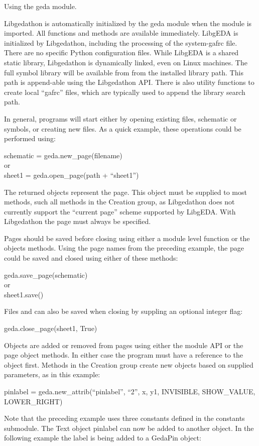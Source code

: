  Using the geda module. 

  Libgedathon is automatically initialized by the geda module when the module is imported. All functions and methods are available immediately. LibgEDA is initialized by Libgedathon, including the processing of the system-gafrc file. There are no specific Python configuration files. While LibgEDA is a shared static library, Libgedathon is dynamically linked, even on Linux machines. The full symbol library will be available from from the installed library path. This path is append-able using the Libgedathon API. There is also utility functions to create local ``gafrc'' files, which are typically used to append the library search path. 


  In general, programs will start either by opening existing files, schematic or symbols, or creating new files. As a quick example, these operations could be performed using:

schematic = geda.new\_page(filename)\\ 
 or\\ 
sheet1 = geda.open\_page(path + ``sheet1'')


  The returned objects represent the page. This object must be supplied to most methods, such all methods in the Creation group, as Libgedathon does not currently support the ``current page'' scheme supported by LibgEDA. With Libgedathon the page must always be specified. 


  Pages should be saved before closing using either a module level function or the objects methods. Using the page names from the preceding example, the page could be saved and closed using either of these methods:

geda.save\_page(schematic)\\ 
 or\\ 
sheet1.save()


  Files and can also be saved when closing by suppling an optional integer flag:

geda.close\_page(sheet1, True)

  Objects are added or removed from pages using either the module API or the page object methods. In either case the program must have a reference to the object first. Methods in the Creation group create new objects based on supplied parameters, as in this example:

pinlabel = geda.new\_attrib(``pinlabel'', ``2'', x, y1, INVISIBLE, SHOW\_VALUE, LOWER\_RIGHT)

  Note that the preceding example uses three constants defined in the constants submodule. The Text object pinlabel can now be added to another object. In the following example the label is being added to a GedaPin object:

